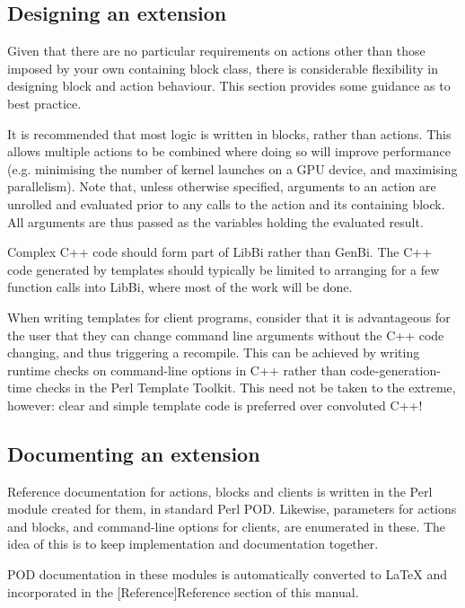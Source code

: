 \subsection{Designing an extension\label{Designing_an_extension}}

Given that there are no particular requirements on actions other than those
imposed by your own containing block class, there is considerable flexibility
in designing block and action behaviour. This section provides some guidance
as to best practice.

It is recommended that most logic is written in blocks, rather than
actions. This allows multiple actions to be combined where doing so will
improve performance (e.g. minimising the number of kernel launches on a GPU
device, and maximising parallelism). Note that, unless otherwise specified,
arguments to an action are unrolled and evaluated prior to any calls to the
action and its containing block. All arguments are thus passed as the
variables holding the evaluated result.

Complex C++ code should form part of LibBi rather than GenBi. The C++ code
generated by templates should typically be limited to arranging for a few
function calls into LibBi, where most of the work will be done.

When writing templates for client programs, consider that it is advantageous
for the user that they can change command line arguments without the C++ code
changing, and thus triggering a recompile. This can be achieved by writing
runtime checks on command-line options in C++ rather than code-generation-time
checks in the Perl Template Toolkit. This need not be taken to the extreme,
however: clear and simple template code is preferred over convoluted C++!

\subsection{Documenting an extension\label{Documenting_an_extension}}

Reference documentation for actions, blocks and clients is written in the Perl
module created for them, in standard Perl POD. Likewise, parameters for
actions and blocks, and command-line options for clients, are enumerated in
these. The idea of this is to keep implementation and documentation together.

POD documentation in these modules is automatically converted to LaTeX and
incorporated in the \hyperref[hyper][Reference]{Reference} section of this
manual.

